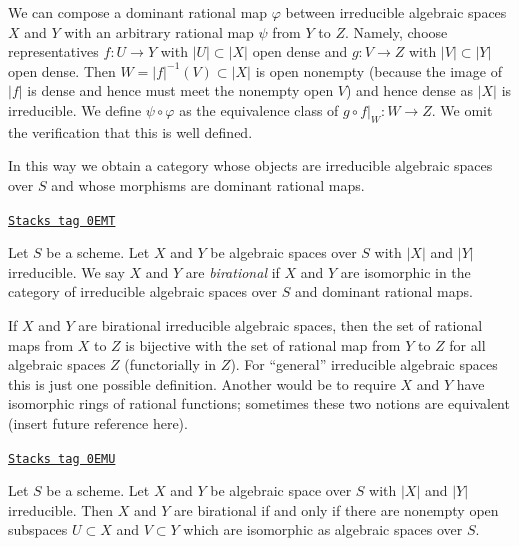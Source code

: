 We can compose a dominant rational map
$\varphi$ between irreducible algebraic spaces
$X$ and $Y$ with an arbitrary rational
map $\psi$ from $Y$ to $Z$. Namely, choose
representatives $f : U \to Y$ with $|U| \subset |X|$ open dense
and $g : V \to Z$ with $|V| \subset |Y|$ open dense. Then
$W = |f|^{-1}(V) \subset |X|$ is open nonempty (because
the image of $|f|$ is dense and hence must meet the nonempty open $V$)
and hence dense as $|X|$ is irreducible. We define $\psi \circ \varphi$
as the equivalence class of $g \circ f|_W : W \to Z$. We omit the verification
that this is well defined.

\medskip\noindent
In this way we obtain a category whose objects are irreducible algebraic
spaces over $S$ and whose morphisms are dominant rational maps.

\begin{definition}
\label{spaces-morphisms-definition-birational-spaces}
\href{https://stacks.math.columbia.edu/tag/0EMT}{\texttt{Stacks tag 0EMT}}

Let $S$ be a scheme. Let $X$ and $Y$ be algebraic spaces
over $S$ with $|X|$ and $|Y|$ irreducible.
We say $X$ and $Y$ are {\it birational} if $X$ and $Y$ are isomorphic
in the category of irreducible algebraic spaces over $S$
and dominant rational maps.
\end{definition}

If $X$ and $Y$ are birational irreducible algebraic spaces,
then the set of rational maps from $X$ to $Z$ is bijective
with the set of rational map from $Y$ to $Z$ for all algebraic
spaces $Z$ (functorially in $Z$). For ``general'' irreducible algebraic spaces
this is just one possible definition. Another would be
to require $X$ and $Y$ have isomorphic rings of
rational functions; sometimes these two notions are equivalent
(insert future reference here).

\begin{lemma}[Birational]
\label{spaces-morphisms-lemma-birational}
\href{https://stacks.math.columbia.edu/tag/0EMU}{\texttt{Stacks tag 0EMU}}

Let $S$ be a scheme. Let $X$ and $Y$ be algebraic
space over $S$ with $|X|$ and $|Y|$ irreducible.
Then $X$ and $Y$ are birational if and only if
there are nonempty open subspaces $U \subset X$ and $V \subset Y$
which are isomorphic as algebraic spaces over $S$.
\end{lemma}

